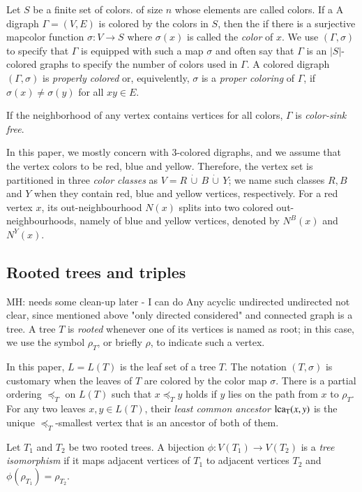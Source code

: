\documentclass[final,3p,times]{elsarticle}
\newcommand{\TODO}[1]{\begingroup\color{red}#1\endgroup}
\newcommand{\OLD}[1]{\begingroup\tiny\color{gray}#1\endgroup}
\newcommand{\mh}[1]{\begingroup\color{magenta}#1\endgroup}
\begin{document}
Let $S$ be a finite set \mh{of colors}. \OLD{of size $n$ whose elements are called colors.} \OLD{If a}
\mh{A} digraph $\Gamma=(V,E)$ is colored by the colors in $S$, \OLD{then the} 
\mh{if there is a} surjective \mh{map}\OLD{color
function} $\sigma: V\to S$ \mh{where 
$\sigma(x)$ is called the \emph{color} of $x$. We use $(\Gamma,\sigma)$ to specify
that $\Gamma$ is equipped with such a map $\sigma$ and often say that $\Gamma$ 
is an $|S|$-colored graphs to specify the number of colors used in $\Gamma$. 
A colored digraph $(\Gamma, \sigma)$ 
is \emph{properly colored} or, equivelently, $\sigma$ is a \emph{proper coloring}
of $\Gamma$, if $\sigma(x)\neq \sigma(y)$ for all $xy\in E$. }

If the neighborhood of any vertex contains
vertices for all colors, $\Gamma$ is \emph{color-sink free}. 


In this paper, we mostly concern with 3-colored digraphs, and we assume that the vertex colors to be red, blue and yellow. Therefore, the vertex set is partitioned in three \emph{color classes} as $V=R\,\dot{\cup}\, B\,\dot{\cup}\, Y$; we name such classes $R,B$ and $Y$ when they contain red, blue and yellow vertices, respectively. For a red vertex $x$, its out-neighbourhood $N(x)$ splits into two colored out-neighbourhoods, namely of blue and yellow vertices, denoted by $N^{B}(x)$ and $N^{Y}(x)$. 

\subsection{Rooted trees and triples} \TODO{MH: needs some clean-up later - I can do}
Any acyclic undirected \TODO{undirected not clear, since mentioned above "only directed considered"} and connected graph is a tree. A tree $T$ is
\emph{rooted} whenever one of its vertices is named as root; in this case, we
use the symbol $\rho_T$, or briefly $\rho$, to indicate such a vertex.  

In this paper, $L=L(T)$ is the leaf set of a tree $T$. The notation $(T,\sigma)$ is customary when the leaves of $T$ are colored by the color map $\sigma$. There is a partial ordering $\preceq_T$ on $L(T)$ such that $x\preceq_T y$ holds if $y$ lies on the path from $x$ to $\rho_T$. For any two leaves $x,y\in L(T)$, their \emph{least common ancestor} ${\rm{lca_T}}(x,y)$ is the unique $\preceq_T$-smallest vertex that is an ancestor of both of them.

Let $T_1$ and $T_2$ be two rooted trees. A bijection $\phi:V(T_1) \rightarrow V(T_2)$ is a \emph{tree isomorphism} if it maps adjacent vertices of $T_1$ to adjacent vertices $T_2$ and  $\phi(\rho_{T_1})=\rho_{T_2}$.
\end{document}
